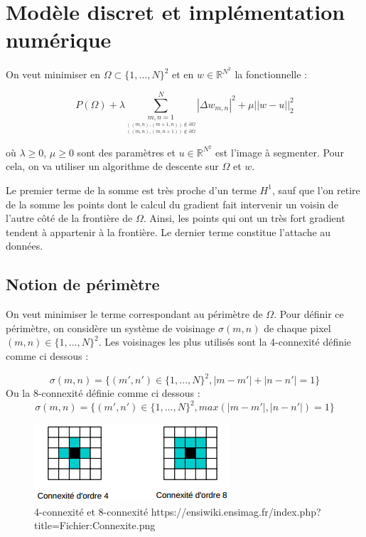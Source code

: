 \section{Modèle discret et implémentation numérique}

On veut minimiser en $\Omega \subset \{1,...,N\}^2$ et en $w \in \mathbb{R}^{N^2}$ la fonctionnelle : 

\[ P(\Omega) + \lambda \sum \limits_{\underset{((m,n), (m, n+1)) \notin \partial \Omega}{\underset{((m,n),(m+1, n)) \notin \partial \Omega}{m,n = 1}}}^{N} |\Delta w_{m,n}|^2 + \mu ||w - u ||_2^2 \]

où $\lambda \geq 0$, $\mu \geq 0$ sont des paramètres et $u \in \mathbb{R}^{N^2}$ est l'image à segmenter. Pour cela, on va utiliser un algorithme de descente sur $\Omega$ et $w$.

\bigskip

Le premier terme de la somme est très proche d'un terme $H^1$, sauf que l'on retire de la somme les points dont le calcul du gradient fait intervenir un voisin de l'autre côté de la frontière de $\Omega$. Ainsi, les points qui ont un très fort gradient tendent à appartenir à la frontière. Le dernier terme constitue l'attache au données. 

\subsection{Notion de périmètre}

On veut minimiser le terme correspondant au périmètre de $\Omega$. Pour définir ce périmètre, on considère un système de voisinage $\sigma(m,n)$ de chaque pixel $(m,n) \in \{1,...,N\}^2$. Les voisinages les plus utilisés sont la 4-connexité définie comme ci dessous :

\[ \sigma (m,n) = \{ (m',n') \in  \{1,...,N\}^2, |m - m' | + |n - n'| = 1 \}\]
Ou la 8-connexité définie comme ci dessous : 
\[ \sigma (m,n) = \{ (m',n') \in  \{1,...,N\}^2, max(|m - m' | , |n - n'| ) = 1 \}\]

\begin{figure}[H]
\centering
\includegraphics[scale=1]{images/Connexite.png}
\caption{4-connexité et 8-connexité \newline  https://ensiwiki.ensimag.fr/index.php?title=Fichier:Connexite.png}
\end{figure}

